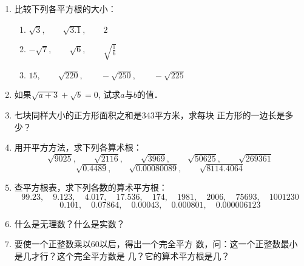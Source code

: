 \begin{enumerate}
\item 比较下列各平方根的大小：
\begin{enumerate}
    \item $\sqrt{3},\qquad \sqrt{3.1},\qquad 2$
    \item $-\sqrt{7},\qquad \sqrt{6},\qquad \sqrt{\frac{1}{6}}$
    \item $15,\qquad \sqrt{220},\qquad -\sqrt{250},\qquad -\sqrt{225}$
\end{enumerate}

\item 如果$\sqrt{a+3}+\sqrt{b}=0$, 试求$a$与$b$的值．
\item 七块同样大小的正方形面积之和是343平方米，求每块
正方形的一边长是多少？
\item 用开平方方法，求下列各算术根：
\[\sqrt{9025},\qquad \sqrt{2116},\qquad \sqrt{3969},\qquad \sqrt{50625},\qquad \sqrt{269361}\]
\[\sqrt{0.4489},\qquad \sqrt{0.00080089},\qquad \sqrt{8114.4064}\]
\item 查平方根表，求下列各数的算术平方根：
\[99.23,\quad 9.123,\quad 4.017,\quad 17.536,\quad 174,\quad 1981,\quad 2006,\quad 
75693,\quad 1001230\]
\[0.101,\quad 0.07864,\quad 0.00043,\quad 0.000801,\quad 
0.000006123\]
\item 什么是无理数？什么是实数？
\item 要使一个正整数乘以60以后，得出一个完全平方
数，问：这一个正整数最小是几才行？这个完全平方数是
几？它的算术平方根是几？
\end{enumerate}

